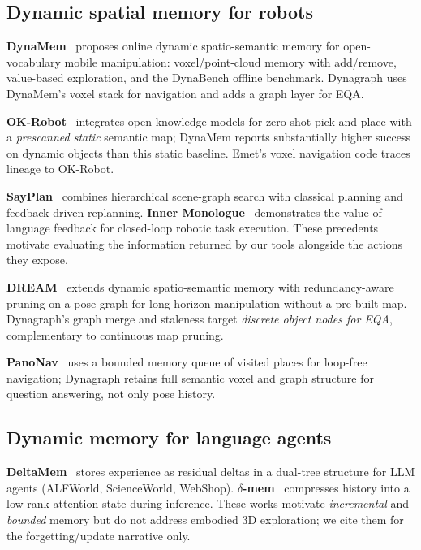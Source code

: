 \subsection{Dynamic spatial memory for robots}

\textbf{DynaMem}~\citep{liu2024dynamem} proposes online dynamic spatio-semantic memory for open-vocabulary mobile manipulation: voxel/point-cloud memory with add/remove, value-based exploration, and the DynaBench offline benchmark.
Dynagraph uses DynaMem's voxel stack for navigation and adds a graph layer for EQA.

\textbf{OK-Robot}~\citep{liu2024okrobot} integrates open-knowledge models for zero-shot pick-and-place with a \emph{prescanned static} semantic map; DynaMem reports substantially higher success on dynamic objects than this static baseline.
Emet's voxel navigation code traces lineage to OK-Robot.

\textbf{SayPlan}~\citep{rana2023sayplan} combines hierarchical scene-graph search with classical planning and feedback-driven replanning.
\textbf{Inner Monologue}~\citep{huang2022innermonologue} demonstrates the value of language feedback for closed-loop robotic task execution.
These precedents motivate evaluating the information returned by our tools alongside the actions they expose.

\textbf{DREAM}~\citep{yan2026dream} extends dynamic spatio-semantic memory with redundancy-aware pruning on a pose graph for long-horizon manipulation without a pre-built map.
Dynagraph's graph merge and staleness target \emph{discrete object nodes for EQA}, complementary to continuous map pruning.

\textbf{PanoNav}~\citep{jin2025panonav} uses a bounded memory queue of visited places for loop-free navigation; Dynagraph retains full semantic voxel and graph structure for question answering, not only pose history.

\subsection{Dynamic memory for language agents}

\textbf{DeltaMem}~\citep{deltamem2026} stores experience as residual deltas in a dual-tree structure for LLM agents (ALFWorld, ScienceWorld, WebShop).
\textbf{$\delta$-mem}~\citep{lei2026deltamem} compresses history into a low-rank attention state during inference.
These works motivate \emph{incremental} and \emph{bounded} memory but do not address embodied 3D exploration; we cite them for the forgetting/update narrative only.

